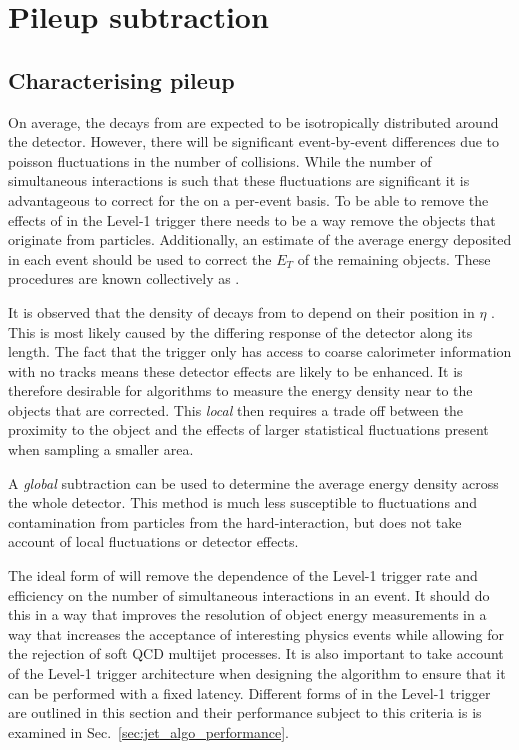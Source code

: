 \section{Pileup subtraction}
\label{sec:pus}

\subsection{Characterising pileup}

On average, the decays from \PU are expected to be isotropically
distributed around the detector. However, there will be significant
event-by-event differences due to poisson fluctuations in the number
of \PU collisions. While the number of simultaneous interactions is
such that these fluctuations are significant it is advantageous to
correct for the \PU on a per-event basis. To be able to remove the
effects of \PU in the Level-1 trigger there needs to be a way remove
the objects that originate from \PU particles. Additionally, an
estimate of the average energy deposited in each event should be used
to correct the $E_T$ of the remaining objects. These procedures are
known collectively as \emph{\PUS}.

It is observed that the density of decays from \PU to
depend on their position in $\eta$ \cite{Cacciari2011}. This is
most likely caused by the differing response of the detector along its
length. The fact that the trigger only has access to
coarse calorimeter information with no tracks means these detector
effects are likely to be enhanced. It is therefore desirable for \PUS
algorithms to measure the \PU energy density near to the objects that
are corrected. This \emph{local} \PUS then requires a trade off
between the proximity to the object and the effects of
larger statistical fluctuations present when sampling a smaller area. 

A \emph{global} subtraction can be used to determine the average
energy density across the whole detector. This method is much less
susceptible to fluctuations and contamination from particles from the
hard-interaction, but does not take account of local fluctuations or
detector effects.

The ideal form of \PUS will remove the dependence of the Level-1
trigger rate and efficiency on the number of simultaneous interactions
in an event. It should do this in a way that improves the resolution
of object energy measurements in a way that increases the acceptance
of interesting physics events while allowing for the rejection of soft
QCD multijet processes. It is also important to take account of the
Level-1 trigger architecture when designing the algorithm to ensure
that it can be performed with a fixed latency. Different forms of \PUS
in the Level-1 trigger are outlined in this section and their
performance subject to this criteria is is examined in
Sec.~\ref{sec:jet_algo_performance}. 

